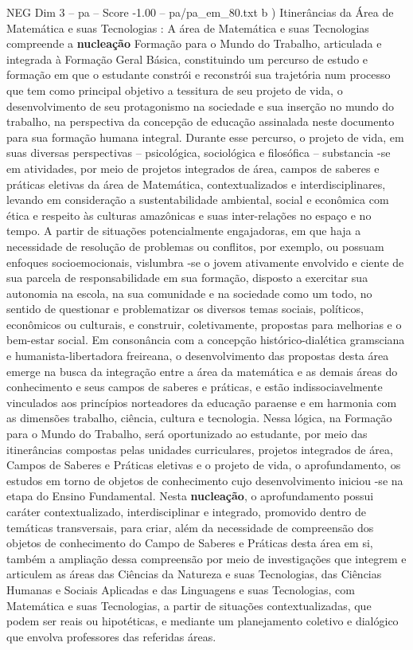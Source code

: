\begin{textsample}{NEG Dim 3 – pa – Score -1.00 – pa/pa\_em\_80.txt}  \label{ex:f3_neg_052}
b ) Itinerâncias da Área de Matemática e suas Tecnologias : A área de Matemática e suas Tecnologias compreende a \textbf{nucleação} Formação para o Mundo do Trabalho, articulada e integrada à Formação Geral Básica, constituindo um percurso de estudo e formação em que o estudante constrói e reconstrói sua trajetória num processo que tem como principal objetivo a tessitura de seu projeto de vida, o desenvolvimento de seu protagonismo na sociedade e sua inserção no mundo do trabalho, na perspectiva da concepção de educação assinalada neste documento para sua formação humana integral.
Durante esse percurso, o projeto de vida, em suas diversas perspectivas – psicológica, sociológica e filosófica – substancia -se em atividades, por meio de projetos integrados de área, campos de saberes e práticas eletivas da área de Matemática, contextualizados e interdisciplinares, levando em consideração a sustentabilidade ambiental, social e econômica com ética e respeito às culturas amazônicas e suas inter-relações no espaço e no tempo.
A partir de situações potencialmente engajadoras, em que haja a necessidade de resolução de problemas ou conflitos, por exemplo, ou possuam enfoques socioemocionais, vislumbra -se o jovem ativamente envolvido e ciente de sua parcela de responsabilidade em sua formação, disposto a exercitar sua autonomia na escola, na sua comunidade e na sociedade como um todo, no sentido de questionar e problematizar os diversos temas sociais, políticos, econômicos ou culturais, e construir, coletivamente, propostas para melhorias e o bem-estar social.
Em consonância com a concepção histórico-dialética gramsciana e humanista-libertadora freireana, o desenvolvimento das propostas desta área emerge na busca da integração entre a área da matemática e as demais áreas do conhecimento e seus campos de saberes e práticas, e estão indissociavelmente vinculados aos princípios norteadores da educação paraense e em harmonia com as dimensões trabalho, ciência, cultura e tecnologia.
Nessa lógica, na Formação para o Mundo do Trabalho, será oportunizado ao estudante, por meio das itinerâncias compostas pelas unidades curriculares, projetos integrados de área, Campos de Saberes e Práticas eletivas e o projeto de vida, o aprofundamento, os estudos em torno de objetos de conhecimento cujo desenvolvimento iniciou -se na etapa do Ensino Fundamental.
Nesta \textbf{nucleação}, o aprofundamento possui caráter contextualizado, interdisciplinar e integrado, promovido dentro de temáticas transversais, para criar, além da necessidade de compreensão dos objetos de conhecimento do Campo de Saberes e Práticas desta área em si, também a ampliação dessa compreensão por meio de investigações que integrem e articulem as áreas das Ciências da Natureza e suas Tecnologias, das Ciências Humanas e Sociais Aplicadas e das Linguagens e suas Tecnologias, com Matemática e suas Tecnologias, a partir de situações contextualizadas, que podem ser reais ou hipotéticas, e mediante um planejamento coletivo e dialógico que envolva professores das referidas áreas.

\end{textsample}
